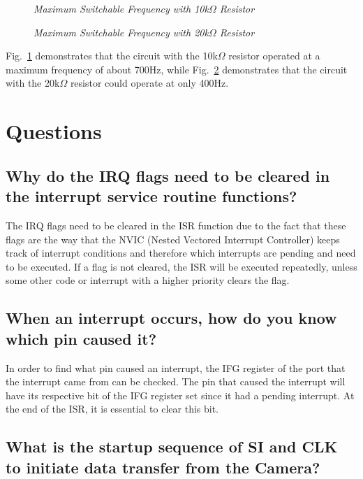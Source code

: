 \documentclass[conference]{IEEEtran}
\begin{document}
\begin{figure}[!ht]
    \centering
    \caption{\textit{Maximum Switchable Frequency with 10k$\Omega$ Resistor}}
    \label{fig:maxFreq10k}
\end{figure}

\begin{figure}[!ht]
    \centering
    \caption{\textit{Maximum Switchable Frequency with 20k$\Omega$ Resistor}}
    \label{fig:maxFreq20k}
\end{figure}

Fig.~\ref{fig:maxFreq10k} demonstrates that the circuit with the 10k$\Omega$
resistor operated at a maximum frequency of about 700Hz, while Fig.~\ref{fig:maxFreq20k}
demonstrates that the circuit with the 20k$\Omega$ resistor could operate at only 400Hz.

\section{Questions}

\subsection{Why do the IRQ flags need to be cleared in the interrupt service
routine functions?}

The IRQ flags need to be cleared in the ISR function due to the fact that
these flags are the way that the NVIC (Nested Vectored Interrupt Controller)
keeps track of interrupt conditions and therefore which interrupts are pending and need to be executed. If
a flag is not cleared, the ISR will be executed repeatedly, unless some other
code or interrupt with a higher priority clears the flag.

\subsection{When an interrupt occurs, how do you know which pin caused it?}

In order to find what pin caused an interrupt, the IFG register of the port
that the interrupt came from can be checked. The pin that caused the
interrupt will have its respective bit of the IFG register set since it had
a pending interrupt. At the end of the ISR, it is essential to clear this
bit.

\subsection{What is the startup sequence of SI and CLK to initiate data 
transfer from the Camera?}
\end{document}
